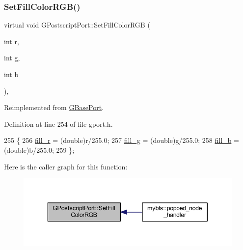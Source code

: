 \subsubsection{\texorpdfstring{Set\+Fill\+Color\+R\+G\+B()}{SetFillColorRGB()}}
{\footnotesize\ttfamily virtual void G\+Postscript\+Port\+::\+Set\+Fill\+Color\+R\+GB (\begin{DoxyParamCaption}\item[{int}]{r,  }\item[{int}]{g,  }\item[{int}]{b }\end{DoxyParamCaption})\hspace{0.3cm}{\ttfamily [inline]}, {\ttfamily [virtual]}}



Reimplemented from \mbox{\hyperlink{class_g_base_port_af13ac2220d4ff90a160294c79d4a2c1b}{G\+Base\+Port}}.



Definition at line 254 of file gport.\+h.


\begin{DoxyCode}
255     \{ 
256         \mbox{\hyperlink{class_g_postscript_port_ab2a7d722f2cc8624ba2deccce41d287d}{fill\_r}} = (double)r/255.0; 
257         \mbox{\hyperlink{class_g_postscript_port_a50c6a0edf2edfb66f6a57b7cf847f2e2}{fill\_g}} = (double)\mbox{\hyperlink{rings_8cpp_aa9df5aa3976a89a96a5f1c7611d42938}{g}}/255.0; 
258         \mbox{\hyperlink{class_g_postscript_port_a60fd8f27f76db55846837e93ccf5f582}{fill\_b}} = (double)b/255.0; 
259     \};
\end{DoxyCode}
Here is the caller graph for this function\+:\nopagebreak
\begin{figure}[H]
\begin{center}
\leavevmode
\includegraphics[width=343pt]{class_g_postscript_port_ad8157268c1db4307eca36108fdc1aa1e_icgraph}
\end{center}
\end{figure}
\mbox{\label{class_g_postscript_port_a63e3cf185f620f9f24ec40f01dc3b02c}} 
